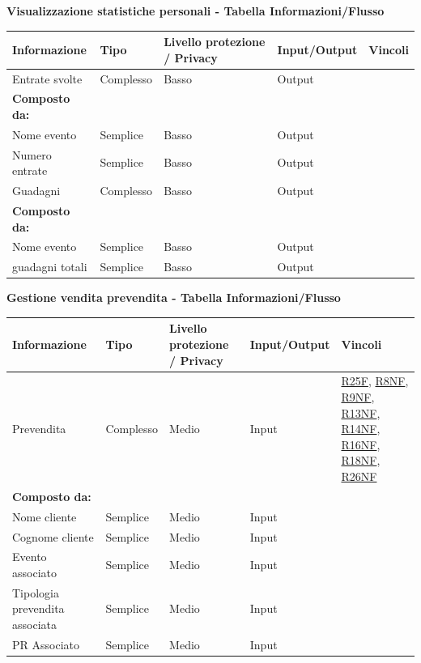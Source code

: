 \documentclass[a4paper]{article}
\begin{document}
\textbf{Visualizzazione statistiche personali  - Tabella Informazioni/Flusso}


\begin{center}
    \begin{tabularx}{1\textwidth}{|X|X|X|X|X|}
        \hline
        \textbf{Informazione} &\textbf{Tipo} & \textbf{Livello protezione / Privacy} & \textbf{Input/Output} & \textbf{Vincoli}\\
        \hline
        \hline
        Entrate svolte & Complesso & Basso & Output & \\
        \textbf{Composto da:} & & & & \\
        Nome evento & Semplice & Basso & Output & \\
        Numero entrate & Semplice & Basso & Output & \\
        \hline
        Guadagni & Complesso & Basso & Output & \\
        \textbf{Composto da:} & & & & \\
        Nome evento & Semplice & Basso & Output & \\
        guadagni totali & Semplice & Basso & Output & \\
        \hline
    \end{tabularx}
\end{center}

\textbf{Gestione vendita prevendita  - Tabella Informazioni/Flusso}

\begin{center}
    \begin{tabularx}{1\textwidth}{|X|X|X|X|X|}
        \hline
        \textbf{Informazione} &\textbf{Tipo} & \textbf{Livello protezione / Privacy} & \textbf{Input/Output} & \textbf{Vincoli}\\
        \hline
        \hline
        Prevendita & Complesso & Medio & Input & \hyperlink{R25F}{R25F}, \hyperlink{R8NF}{R8NF}, \hyperlink{R9NF}{R9NF}, \hyperlink{R13NF}{R13NF}, \hyperlink{R14NF}{R14NF}, \hyperlink{R16NF}{R16NF}, \hyperlink{R18NF}{R18NF}, \hyperlink{R26NF}{R26NF} \\
        \textbf{Composto da:} & & & & \\
        Nome cliente & Semplice & Medio & Input & \\
        Cognome cliente & Semplice & Medio & Input & \\
        Evento associato & Semplice & Medio & Input & \\
        Tipologia prevendita associata & Semplice & Medio & Input & \\
        PR Associato & Semplice & Medio & Input & \\
        \hline
    \end{tabularx}
\end{center}
\end{document}
